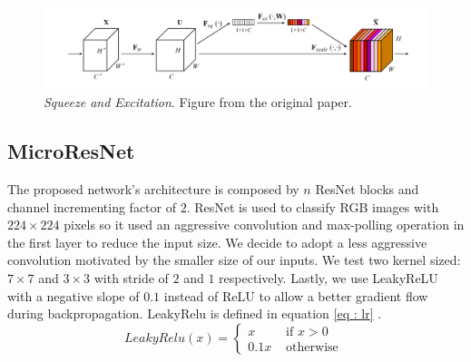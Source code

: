 \documentclass[../document.tex]{subfiles}
\begin{document}
\begin{figure}[htbp]
    \centering
    \includegraphics[width=\linewidth]{../img/implementation/estimator/se.png}
    \caption{\emph{Squeeze and Excitation}. Figure from the original paper. \cite{hu2017squeeze}}
\label{fig : se}
\end{figure}
\subsection{MicroResNet}
\label{subsec : micro-resnets}
The proposed network's architecture is composed by $n$ ResNet blocks and channel incrementing factor of $2$. ResNet is used to classify RGB images with $224\times224$ pixels so it used an aggressive convolution and max-polling operation in the first layer to reduce the input size. We decide to adopt a less aggressive convolution motivated by the smaller size of our inputs. We test two kernel sized: $7\times7$ and $3\times3$ with stride of $2$ and $1$ respectively. Lastly, we use LeakyReLU \cite{leakyrelu} with a negative slope of $0.1$ instead of ReLU to allow a better gradient flow during backpropagation. LeakyRelu is defined in equation \ref{eq : lr} .
\begin{equation}
LeakyRelu(x)=\left\{\begin{array}{ll}{x} & {\text { if } x>0} \\ {0.1 x} & {\text { otherwise }}\end{array}\right.
\label{eq : lr}
\end{equation}
\end{document}
